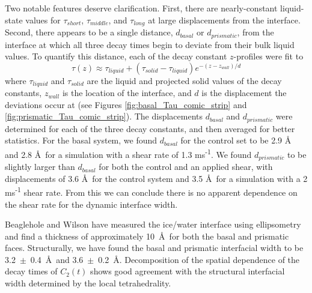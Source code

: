 Two notable features deserve clarification.  First, there are
nearly-constant liquid-state values for $\tau_{short}$,
$\tau_{middle}$, and $\tau_{long}$ at large displacements from the
interface. Second, there appears to be a single distance, $d_{basal}$
or $d_{prismatic}$, from the interface at which all three decay times
begin to deviate from their bulk liquid values. To quantify this
distance, each of the decay constant $z$-profiles were fit to
\begin{equation}\label{tauFit}
\tau(z)\approx\tau_{liquid}+(\tau_{solid}-\tau_{liquid})e^{-(z-z_{wall})/d}
\end{equation}
where $\tau_{liquid}$ and $\tau_{solid}$ are the liquid and projected
solid values of the decay constants, $z_{wall}$ is the location of the
interface, and $d$ is the displacement the deviations occur at (see
Figures \ref{fig:basal_Tau_comic_strip} and
\ref{fig:prismatic_Tau_comic_strip}). The displacements $d_{basal}$
and $d_{prismatic}$ were determined for each of the three decay
constants, and then averaged for better statistics.
For the basal system, we found $d_{basal}$ for the control set to be
2.9 \AA\, and 2.8 \AA\ for a simulation with a shear rate of 1.3
ms\textsuperscript{-1}. We found $d_{prismatic}$ to be slightly
larger than $d_{basal}$ for both the control and an applied shear,
with displacements of 3.6 \AA\ for the control system and 3.5 \AA\ for
a simulation with a 2 ms\textsuperscript{-1} shear rate. From this we
can conclude there is no apparent dependence on the shear rate for the dynamic interface
width. 

Beaglehole and Wilson have measured the ice/water interface using
ellipsometry and find a thickness of approximately 10~\AA\ for both
the basal and prismatic faces.\cite{Beaglehole93} Structurally, we
have found the basal and prismatic interfacial width to be
3.2~$\pm$~0.4~\AA\ and 3.6~$\pm$~0.2~\AA.  Decomposition of
the spatial dependence of the decay times of $C_2(t)$ shows good
agreement with the structural interfacial width determined by the
local tetrahedrality.


